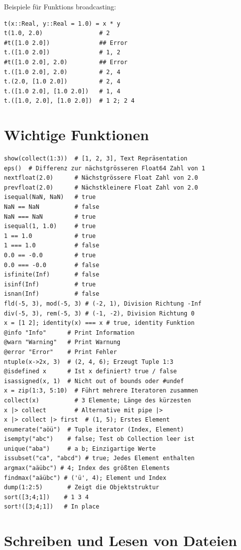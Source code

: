 \documentclass[10pt,twocolumn]{scrartcl}
\begin{document}
Beispiele für Funktions broadcasting:
\begin{lstlisting}
t(x::Real, y::Real = 1.0) = x * y
t(1.0, 2.0)                # 2
#t([1.0 2.0])              ## Error
t.([1.0 2.0])              # 1, 2
#t([1.0 2.0], 2.0)         ## Error
t.([1.0 2.0], 2.0)         # 2, 4
t.(2.0, [1.0 2.0])         # 2, 4
t.([1.0 2.0], [1.0 2.0])   # 1, 4
t.([1.0, 2.0], [1.0 2.0])  # 1 2; 2 4
\end{lstlisting}

\section{Wichtige Funktionen}
\label{sec:wichtigeFuntionen}

\begin{lstlisting}
show(collect(1:3))  # [1, 2, 3], Text Repräsentation
eps()  # Differenz zur nächstgrösseren Float64 Zahl von 1
nextfloat(2.0)      # Nächstgrössere Float Zahl von 2.0
prevfloat(2.0)      # Nächstkleinere Float Zahl von 2.0
isequal(NaN, NaN)   # true
NaN == NaN          # false
NaN === NaN         # true
isequal(1, 1.0)     # true
1 == 1.0            # true
1 === 1.0           # false
0.0 == -0.0         # true
0.0 === -0.0        # false
isfinite(Inf)       # false
isinf(Inf)          # true
isnan(Inf)          # false
fld(-5, 3), mod(-5, 3) # (-2, 1), Division Richtung -Inf
div(-5, 3), rem(-5, 3) # (-1, -2), Division Richtung 0
x = [1 2]; identity(x) === x # true, identity Funktion
@info "Info"      # Print Information
@warn "Warning"   # Print Warnung
@error "Error"    # Print Fehler
ntuple(x->2x, 3)  # (2, 4, 6); Erzeugt Tuple 1:3
@isdefined x      # Ist x definiert? true / false
isassigned(x, 1)  # Nicht out of bounds oder #undef
x = zip(1:3, 5:10)  # Führt mehrere Iteratoren zusammen
collect(x)          # 3 Elemente; Länge des kürzesten
x |> collect        # Alternative mit pipe |>
x |> collect |> first  # (1, 5); Erstes Element
enumerate("aöü")  # Tuple iterator (Index, Element)
isempty("abc")    # false; Test ob Collection leer ist
unique("aba")     # a b; Einzigartige Werte
issubset("ca", "abcd") # true; Jedes Element enthalten
argmax("aäübc") # 4; Index des größten Elements
findmax("aäübc") # ('ü', 4); Element und Index
dump(1:2:5)       # Zeigt die Objektstruktur
sort([3;4;1])    # 1 3 4
sort!([3;4;1])   # In place
\end{lstlisting}

\section{Schreiben und Lesen von Dateien}
\label{sec:fileIO}
\end{document}
